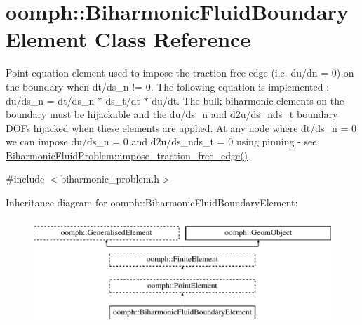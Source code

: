 \hypertarget{classoomph_1_1BiharmonicFluidBoundaryElement}{}\section{oomph\+:\+:Biharmonic\+Fluid\+Boundary\+Element Class Reference}
\label{classoomph_1_1BiharmonicFluidBoundaryElement}


Point equation element used to impose the traction free edge (i.\+e. du/dn = 0) on the boundary when dt/ds\+\_\+n != 0. The following equation is implemented \+: du/ds\+\_\+n = dt/ds\+\_\+n $\ast$ ds\+\_\+t/dt $\ast$ du/dt. The bulk biharmonic elements on the boundary must be hijackable and the du/ds\+\_\+n and d2u/ds\+\_\+nds\+\_\+t boundary D\+O\+Fs hijacked when these elements are applied. At any node where dt/ds\+\_\+n = 0 we can impose du/ds\+\_\+n = 0 and d2u/ds\+\_\+nds\+\_\+t = 0 using pinning -\/ see \hyperlink{classoomph_1_1BiharmonicFluidProblem_a1cc57555bbd0ceef1d93010c133ac597}{Biharmonic\+Fluid\+Problem\+::impose\+\_\+traction\+\_\+free\+\_\+edge()}  




{\ttfamily \#include $<$biharmonic\+\_\+problem.\+h$>$}

Inheritance diagram for oomph\+:\+:Biharmonic\+Fluid\+Boundary\+Element\+:\begin{figure}[H]
\begin{center}
\leavevmode
\includegraphics[height=4.000000cm]{classoomph_1_1BiharmonicFluidBoundaryElement}
\end{center}
\end{figure}
